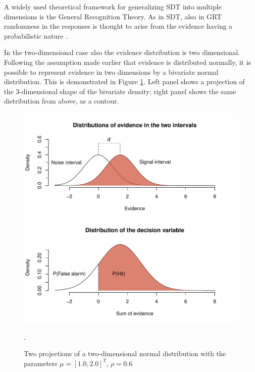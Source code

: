 \documentclass{article}\usepackage{knitr}
\begin{document}
A widely used theoretical framework for generalizing SDT into multiple dimensions is the General Recognition Theory. As in SDT, also in GRT randomness in the responses is thought to arise from the evidence having a probabilistic nature \citep{ashby1986, ashby2015, kadlec1992}. 

In the two-dimensional case also the evidence distribution is two dimensional. Following the assumption made earlier that evidence is distributed normally, it is possible to represent evidence in two dimensions by a bivariate normal distribution. This is demonstrated in Figure \ref{fig:2dimnorm}. Left panel shows a projection of the 3-dimensional shape of the bivariate density; right panel shows the same distribution from above, as a contour.  

\begin{figure}
\centering
\begin{knitrout}
\color{fgcolor}
\includegraphics[width=\maxwidth]{figure/unnamed-chunk-7-1} 

\end{knitrout}
\caption{Two projections of a two-dimensional normal distribution with the parameters $\mu = [1.0, 2.0]^T$, $\rho = 0.6$}. 
\label{fig:2dimnorm}
\end{figure}
\end{document}
